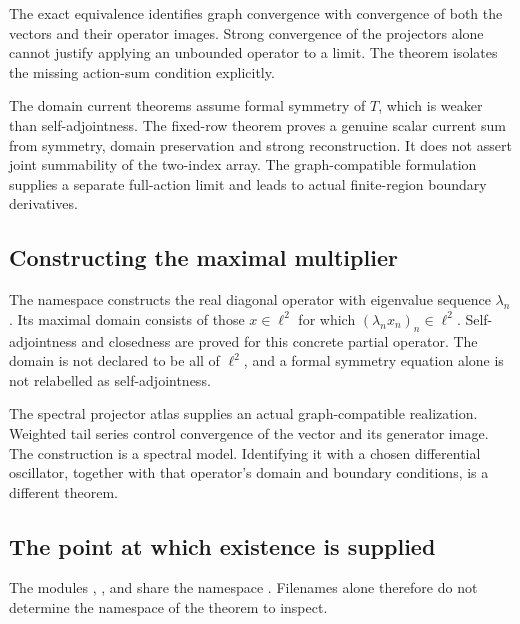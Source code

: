 The exact equivalence  identifies graph convergence with convergence of both the vectors and their operator images. Strong convergence of the projectors alone cannot justify applying an unbounded operator to a limit. The theorem  isolates the missing action-sum condition explicitly.

The domain current theorems assume formal symmetry of \(T\), which is weaker than self-adjointness. The fixed-row theorem  proves a genuine scalar current sum from symmetry, domain preservation and strong reconstruction. It does not assert joint summability of the two-index array. The graph-compatible formulation supplies a separate full-action limit and leads to actual finite-region boundary derivatives.

\subsection{Constructing the maximal multiplier}

The namespace  constructs the real diagonal operator with eigenvalue sequence \(\lambda_n\). Its maximal domain consists of those \(x\in\ell^2\) for which \((\lambda_nx_n)_n\in\ell^2\). Self-adjointness and closedness are proved for this concrete partial operator. The domain is not declared to be all of \(\ell^2\), and a formal symmetry equation alone is not relabelled as self-adjointness.

The spectral projector atlas supplies an actual graph-compatible realization. Weighted tail series control convergence of the vector and its generator image. The construction is a spectral model. Identifying it with a chosen differential oscillator, together with that operator's domain and boundary conditions, is a different theorem.

\subsection{The point at which existence is supplied}

The modules , ,  and  share the namespace . Filenames alone therefore do not determine the namespace of the theorem to inspect.

